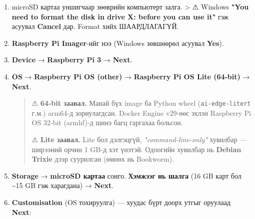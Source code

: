 \begin{enumerate}
\def\labelenumi{\arabic{enumi}.}
\item
  microSD картаа уншигчаар зөөврийн компьютерт залга.
  \textgreater{} ⚠ Windows \textbf{"You need to format the disk in drive X: before you can use it"} гэж асуувал \textbf{Cancel} дар. Format хийх ШААРДЛАГАГҮЙ.
\item
  \textbf{Raspberry Pi Imager}-ийг нээ (Windows зөвшөөрөл асуувал \textbf{Yes}).
\item
  \textbf{Device} → \textbf{Raspberry Pi 3} → \textbf{Next}.
\item
  \textbf{OS} → \textbf{Raspberry Pi OS (other)} → \textbf{Raspberry Pi OS Lite (64-bit)} → \textbf{Next}.

  \begin{quote}
  ⚠ \textbf{64-bit заавал.} Манай бүх image ба Python wheel (\texttt{ai-edge-litert} г.м.) arm64-д зориулагдсан. Docker Engine v29-өөс эхлэн Raspberry Pi OS 32-bit (armhf)-д шинэ багц гаргахаа больсон.

  ⚠ \textbf{Lite заавал.} Lite бол дэлгэцгүй, \emph{"command-line-only"} хувилбар --- ширээний орчин 1 GB-д хэт үнэтэй. Одоогийн хувилбар нь \textbf{Debian Trixie} дээр суурилсан (өмнөх нь Bookworm).
  \end{quote}
\item
  \textbf{Storage} → \textbf{microSD картаа} сонго. \textbf{Хэмжээг нь шалга} (16 GB карт бол \textasciitilde15 GB гэж харагдана) → \textbf{Next}.
\item
  \textbf{Customisation} (OS тохируулга) --- хуудас бүрт доорх утгыг оруулаад \textbf{Next}:


\end{enumerate}
